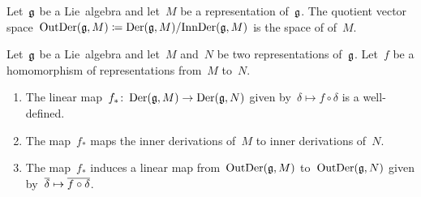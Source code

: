 \begin{definition}
  Let~$\mathfrak{g}$ be a Lie~algebra and let~$M$ be a representation of~$\mathfrak{g}$.
  The quotient vector space~$\operatorname{OutDer}(\mathfrak{g}, M) \coloneqq \operatorname{Der}(\mathfrak{g}, M) / { \operatorname{InnDer}(\mathfrak{g}, M) }$ is the space of  of~$M$.
\end{definition}


\begin{proposition}
  \label{functiorality of outer derivations}
  Let~$\mathfrak{g}$ be a Lie~algebra and let~$M$ and~$N$ be two representations of~$\mathfrak{g}$.
  Let~$f$ be a homomorphism of representations from~$M$ to~$N$.
  \begin{enumerate}
    \item
      The linear map~$f_* \colon \Der(\glie, M) \to \Der(\glie, N)$ given by~$\delta \mapsto f \circ \delta$ is a well-defined.
    \item
      The map~$f_*$ maps the inner derivations of~$M$ to inner derivations of~$N$.
    \item
      The map~$f_*$ induces a linear map from~$\operatorname{OutDer}(\mathfrak{g}, M)$ to~$\operatorname{OutDer}(\mathfrak{g}, N)$ given by~$\class{\delta} \mapsto \class{f \circ \delta}$.
  \end{enumerate}
\end{proposition}


